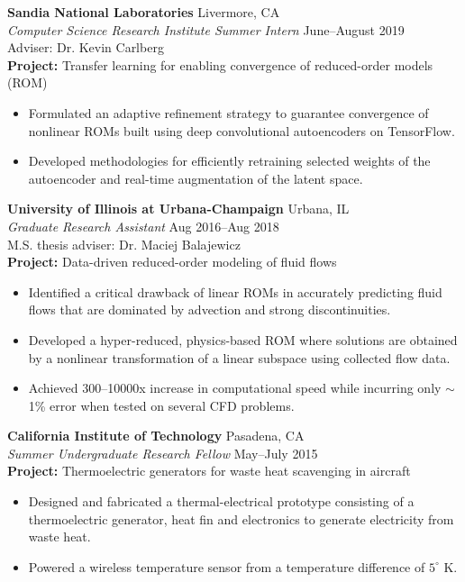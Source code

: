 \documentclass[margin]{res}
\begin{document}
\begin{resume}
{\bf Sandia National Laboratories} \hfill Livermore, CA \\
{\it Computer Science Research Institute Summer Intern} \hfill June--August 2019\\
Adviser: Dr. Kevin Carlberg \\
%
\textbf{Project:} Transfer learning for enabling convergence of reduced-order models (ROM)
\begin{itemize}
\item Formulated an adaptive refinement strategy to guarantee convergence of nonlinear ROMs built using deep convolutional autoencoders on TensorFlow.
\item Developed methodologies for efficiently retraining selected weights of the autoencoder and real-time augmentation of the latent space.
\end{itemize}

{\bf University of Illinois at Urbana-Champaign} \hfill Urbana, IL \\
{\it Graduate Research Assistant} \hfill Aug 2016--Aug 2018\\
M.S. thesis adviser: Dr. Maciej Balajewicz\\
\textbf{Project:} Data-driven reduced-order modeling of fluid flows
\begin{itemize}
	\item Identified a critical drawback of linear ROMs in accurately predicting fluid flows that are dominated by advection and strong discontinuities.
	\item Developed a hyper-reduced, physics-based ROM where solutions are obtained by a nonlinear transformation of a linear subspace using collected flow data.
	\item Achieved 300--10000x increase in computational speed while incurring only $\sim$1\% error when tested on several CFD problems. 
\end{itemize}

{\bf California Institute of Technology} \hfill Pasadena, CA\\
{\it Summer Undergraduate Research Fellow} \hfill May--July 2015\\
\textbf{Project:} Thermoelectric generators for waste heat scavenging in aircraft
\begin{itemize}
	\item Designed and fabricated a thermal-electrical prototype consisting of a thermoelectric generator, heat fin and electronics to generate electricity from waste heat. 
	\item Powered a wireless temperature sensor from a temperature difference of $5^\circ$ K.
\end{itemize}


\end{resume}
\end{document}
